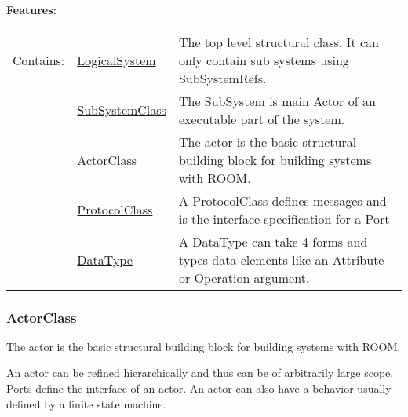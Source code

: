 	\begingroup
	\textbf{Features:}
	\renewcommand{\arraystretch}{1.8} %
	\begin{longtable}{l|l p{}}
		\hline
	Contains: & \tabitem \hyperlink{ref:LogicalSystem}{LogicalSystem}  & The top level structural class. It can only contain sub systems using SubSystemRefs.\\
	& \tabitem \hyperlink{ref:SubSystemClass}{SubSystemClass}  & The SubSystem is main Actor of an executable part of the system.  \\
	& \tabitem \hyperlink{ref:ActorClass}{ActorClass}  & The actor is the basic structural building block for building systems with ROOM. \\
	& \tabitem \hyperlink{ref:ProtocolClass}{ProtocolClass}  & A ProtocolClass defines messages and is the interface specification for a Port \\
	& \tabitem \hyperlink{ref:DataType}{DataType}  & A DataType can take 4 forms and types data elements like an Attribute or Operation argument. \\
	\hline
	\end{longtable}
	\endgroup
	
	
	\subsubsection{ActorClass}
		\hypertarget{ref:ActorClass}{}
		
		The actor is the basic structural building block for building systems with ROOM.
		
		An actor can be refined hierarchically and thus can be of arbitrarily large scope. Ports define the interface of an actor. An actor can also have a behavior usually defined by a finite state machine. 
		
		
		

